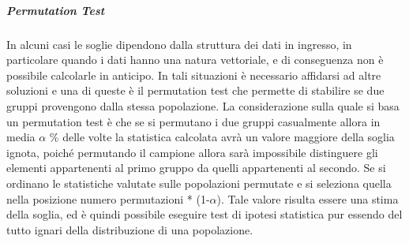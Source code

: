 \subparagraph{Permutation Test}
In alcuni casi le soglie dipendono dalla struttura dei dati in ingresso, in particolare quando i dati hanno una natura vettoriale, e di conseguenza non è possibile calcolarle in anticipo. In tali situazioni è necessario affidarsi ad altre soluzioni e una di queste è il permutation test che permette di stabilire se due gruppi provengono dalla stessa popolazione. La considerazione sulla quale si basa un permutation test è che se si permutano i due gruppi casualmente allora in media $\alpha$ \% delle volte la statistica calcolata avrà un valore maggiore della soglia ignota, poiché permutando il campione allora sarà impossibile distinguere gli elementi appartenenti al primo gruppo da quelli appartenenti al secondo. 
Se si ordinano le statistiche valutate sulle popolazioni permutate e si seleziona quella nella posizione numero permutazioni * (1-$\alpha$). Tale valore risulta essere una stima della soglia, ed è quindi possibile eseguire test di ipotesi statistica pur essendo del tutto ignari della distribuzione di una popolazione.